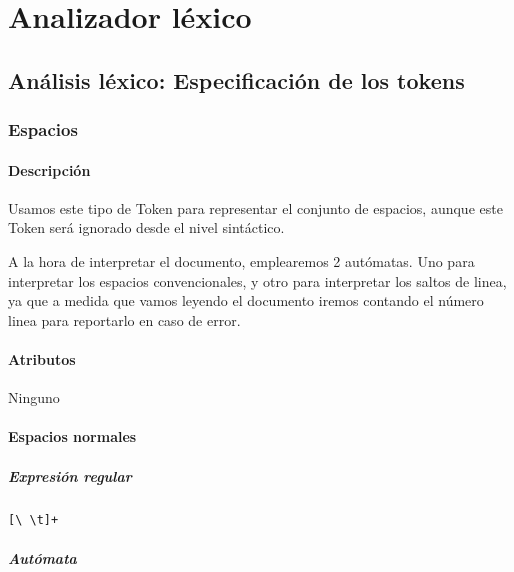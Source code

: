 
\part{Analizador léxico}


\chapter{Análisis léxico: Especificación de los tokens}
    
    \section{Espacios}
    
        \subsection{Descripción}
        
            Usamos este tipo de Token para representar el conjunto de espacios, aunque este Token será ignorado desde el nivel sintáctico.
        
            A la hora de interpretar el documento, emplearemos 2 autómatas. Uno para interpretar los espacios convencionales, y otro para interpretar los saltos de linea, ya que a medida que vamos leyendo el documento iremos contando el número linea para reportarlo en caso de error.
        
        \subsection{Atributos}
        
            Ninguno
            
	    \subsection{Espacios normales}
     
            \subsubsection{Expresión regular}
                \begin{lstlisting}[language=Perl]
[\ \t]+
                \end{lstlisting}

            \subsubsection{Autómata}
            
